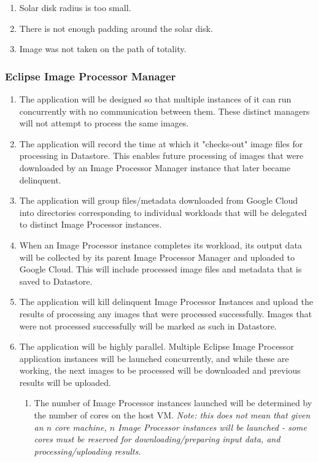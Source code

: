 \documentclass[10pt, onecolumn, draftclsnofoot, letterpaper, compsoc]{IEEEtran}
\begin{document}
\begin{enumerate}
\begin{enumerate}
			\item Solar disk radius is too small.

			\item There is not enough padding around the solar disk.

			\item Image was not taken on the path of totality.
		\end{enumerate}

	\end{enumerate}

\subsubsection{Eclipse Image Processor Manager}
	\begin{enumerate}
		\item The application will be designed so that multiple instances of it
		can run concurrently with no communication between them.
		These distinct managers will not attempt to process the same images.

		\item The application will record the time at which it "checks-out" image
		files for processing in Datastore. This enables future processing of images
		that were downloaded by an Image Processor Manager instance that later became
		delinquent.

		\item The application will group files/metadata downloaded from Google
		Cloud into directories corresponding to individual workloads that will be 
		delegated to distinct Image Processor instances.

		\item When an Image Processor instance completes its workload, its output data 
		will be collected by its parent Image Processor Manager and uploaded to Google 
		Cloud. This will include processed image files and metadata that is saved to 
		Datastore.

		\item The application will kill delinquent Image Processor Instances and upload
		the results of processing any images that were processed successfully. Images that
		were not processed successfully will be marked as such in Datastore. 
		
		\item The application will be highly parallel. Multiple Eclipse Image Processor
		application instances will be launched concurrently, and while these are working, 
		the next images to be processed will be downloaded and previous results will be 
		uploaded. 
		\begin{enumerate}
			\item The number of Image Processor instances launched will be determined by
			the number of cores on the host VM. \textit{Note: this does not mean that
			given an \(n\) core machine, \(n\) Image Processor instances will be launched - some cores
			must be reserved for downloading/preparing input data, and processing/uploading results}.
		\end{enumerate}

	\end{enumerate}
\end{document}
